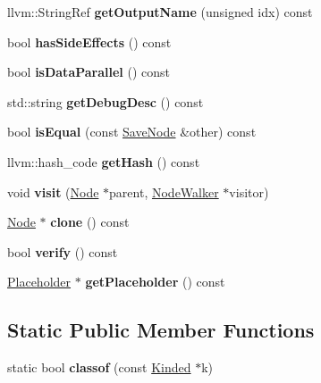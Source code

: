 \begin{DoxyCompactItemize}
llvm\+::\+String\+Ref {\bfseries get\+Output\+Name} (unsigned idx) const
\item 
\mbox{\label{classglow_1_1_save_node_a916f74b2ce71c22bbbecbc07b3ad5cef}} 
bool {\bfseries has\+Side\+Effects} () const
\item 
\mbox{\label{classglow_1_1_save_node_a10be0e415c7c63f6617099e8d0c31c04}} 
bool {\bfseries is\+Data\+Parallel} () const
\item 
\mbox{\label{classglow_1_1_save_node_a8819f3fe14e41ef7ee3892bfd5ab3fc5}} 
std\+::string {\bfseries get\+Debug\+Desc} () const
\item 
\mbox{\label{classglow_1_1_save_node_afadae8b3e3f96ddba98989907d8bd33c}} 
bool {\bfseries is\+Equal} (const \hyperlink{classglow_1_1_save_node}{Save\+Node} \&other) const
\item 
\mbox{\label{classglow_1_1_save_node_a221cadf3656f15a76d11f3cca9694048}} 
llvm\+::hash\+\_\+code {\bfseries get\+Hash} () const
\item 
\mbox{\label{classglow_1_1_save_node_a80010bf44a1673c44efc9af4a51d4f14}} 
void {\bfseries visit} (\hyperlink{classglow_1_1_node}{Node} $\ast$parent, \hyperlink{classglow_1_1_node_walker}{Node\+Walker} $\ast$visitor)
\item 
\mbox{\label{classglow_1_1_save_node_a5e7b64f3321ca510f5d6808c3da5ed3c}} 
\hyperlink{classglow_1_1_node}{Node} $\ast$ {\bfseries clone} () const
\item 
\mbox{\label{classglow_1_1_save_node_a98d1a496bf714d71a42470bc1ac5e816}} 
bool {\bfseries verify} () const
\item 
\mbox{\label{classglow_1_1_save_node_a0d8d453a108f05052773df617541ad7f}} 
\hyperlink{classglow_1_1_placeholder}{Placeholder} $\ast$ {\bfseries get\+Placeholder} () const
\end{DoxyCompactItemize}
\subsection*{Static Public Member Functions}
\begin{DoxyCompactItemize}
\item 
\mbox{\label{classglow_1_1_save_node_a35782a507b59cb1350e54b9e69fc2e93}} 
static bool {\bfseries classof} (const \hyperlink{classglow_1_1_kinded}{Kinded} $\ast$k)
\end{DoxyCompactItemize}
